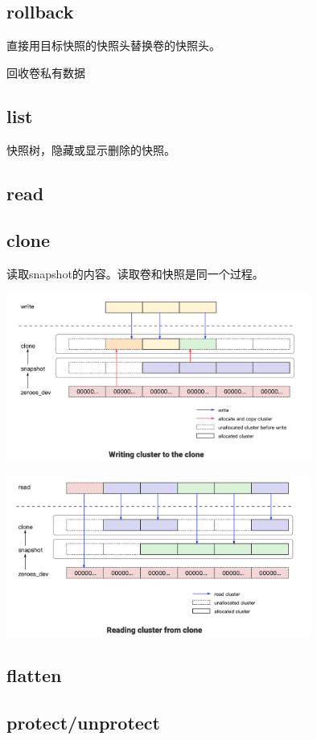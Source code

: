 \subsection{rollback}

直接用目标快照的快照头替换卷的快照头。

回收卷私有数据

\subsection{list}

快照树，隐藏或显示删除的快照。

\subsection{read}

\subsection{clone}

读取snapshot的内容。读取卷和快照是同一个过程。

\begin{center}
\includegraphics[width=10cm]{../imgs/snapshot/clone-write.png}
\end{center}

\begin{center}
\includegraphics[width=10cm]{../imgs/snapshot/clone-read.png}
\end{center}

\subsection{flatten}

\subsection{protect/unprotect}

